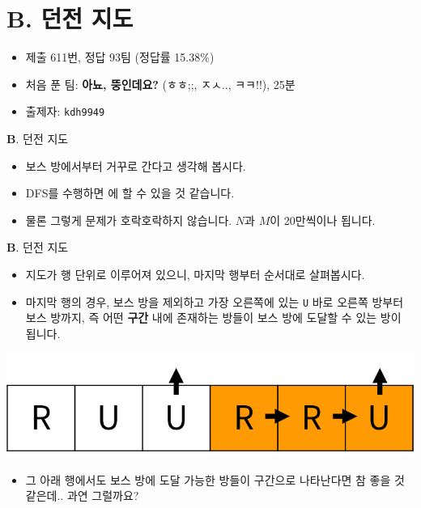 \section{B. 던전 지도}

\begin{frame} %
    \begin{itemize}
        \item 제출 611번, 정답 93팀 (정답률 15.38\%)
        \item 처음 푼 팀: \textbf{아뇨, 뚱인데요?} (ㅎㅎ;;, ㅈㅅ.., ㅋㅋ!!), 25분
        \item 출제자: \texttt{kdh9949}
    \end{itemize}
\end{frame}

\begin{frame}{\textbf{B}. 던전 지도}
    \begin{itemize}
        \item 보스 방에서부터 거꾸로 간다고 생각해 봅시다.
        \item DFS를 수행하면  에 할 수 있을 것 같습니다.
        \item 물론 그렇게 문제가 호락호락하지 않습니다. $N$과 $M$이 20만씩이나 됩니다.
    \end{itemize}
\end{frame}

\begin{frame}{\textbf{B}. 던전 지도}
    \vspace{8pt}
    \begin{itemize}
        \item 지도가 행 단위로 이루어져 있으니, 마지막 행부터 순서대로 살펴봅시다.
        \item 마지막 행의 경우, 보스 방을 제외하고 가장 오른쪽에 있는 \texttt{U} 바로 오른쪽 방부터 보스 방까지, 즉 어떤 \textbf{구간} 내에 존재하는 방들이 보스 방에 도달할 수 있는 방이 됩니다.
    \end{itemize}
    \begin{center}
        \includegraphics[width=0.4\linewidth]{../images/dungeon-map/b-lastrow.png}
    \end{center}
    \begin{itemize}
        \item 그 아래 행에서도 보스 방에 도달 가능한 방들이 구간으로 나타난다면 참 좋을 것 같은데.. 과연 그럴까요?
    \end{itemize}
\end{frame}


